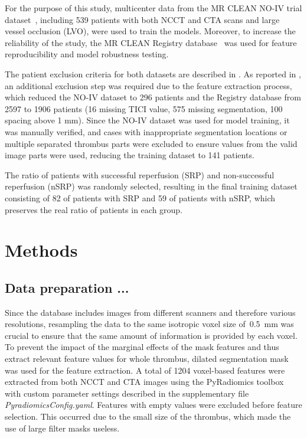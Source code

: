 \documentclass[preprint,12pt]{elsarticle}
\begin{document}
For the purpose of this study, multicenter data from the MR CLEAN NO-IV trial dataset~\cite{Jansen2018}, including 539 patients with both NCCT and CTA scans and large vessel occlusion (LVO), were used to train the models. Moreover, to increase the reliability of the study, the MR CLEAN Registry database~\cite{IvoGHJansen20180309} was used for feature reproducibility and model robustness testing.


The patient exclusion criteria for both datasets are described in \cite{Mojtahedi2024}. As reported in \cite{Nemcekova2025}, an additional exclusion step was required due to the feature extraction process, which reduced the NO-IV dataset to 296 patients and the Registry database from 2597 to 1906 patients (16 missing TICI value, 575 missing segmentation, 100 spacing above 1 mm). Since the NO-IV dataset was used for model training, it was manually verified, and cases with inappropriate segmentation locations or multiple separated thrombus parts were excluded to ensure values from the valid image parts were used, reducing the training dataset to 141 patients.

The ratio of patients with successful reperfusion (SRP) and non-successful reperfusion (nSRP) was randomly selected, resulting in the final training dataset consisting of 82 of patients with SRP and 59 of patients with nSRP, which preserves the real ratio of patients in each group.


\section{Methods}

\subsection{Data preparation ...}

Since the database includes images from different scanners and therefore various resolutions, resampling the data to the same isotropic voxel size of~0.5~mm was crucial to ensure that the same amount of information is provided by each voxel. To prevent the impact of the marginal effects of the mask features and thus extract relevant feature values for whole thrombus, dilated segmentation mask was used for the feature extraction. A total of 1204 voxel-based features were extracted from both NCCT and CTA images using the PyRadiomics toolbox~\cite{VanGriethuysen20171031} with custom parameter settings described in the supplementary file \textit{PyradiomicsConfig.yaml}. Features with empty values were excluded before feature selection. This occurred due to the small size of the thrombus, which made the use of large filter masks useless.
\end{document}
